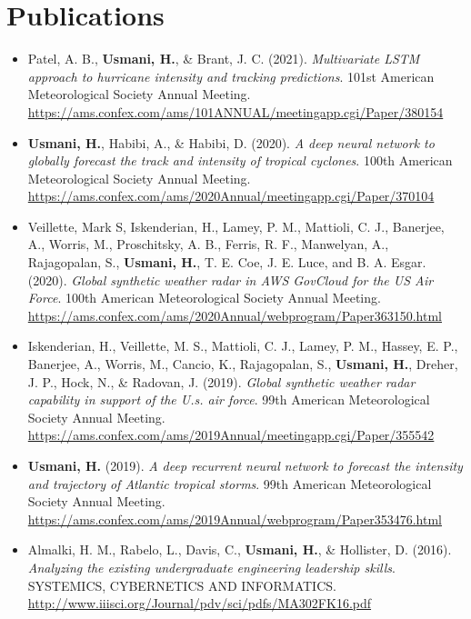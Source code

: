 \documentclass[letterpaper,11pt]{article}
\begin{document}
\section{Publications}
  \begin{itemize}[itemsep=5pt]
    \item Patel, A. B., \textbf{Usmani, H.}, \& Brant, J. C. (2021). \textit{Multivariate LSTM approach to hurricane intensity and tracking predictions}. 101st American Meteorological Society Annual Meeting. \url{https://ams.confex.com/ams/101ANNUAL/meetingapp.cgi/Paper/380154}
    \item \textbf{Usmani, H.}, Habibi, A., \& Habibi, D. (2020). \textit{A deep neural network to globally forecast the track and intensity of tropical cyclones}. 100th American Meteorological Society Annual Meeting. \url{https://ams.confex.com/ams/2020Annual/meetingapp.cgi/Paper/370104}
    \item Veillette, Mark S, Iskenderian, H., Lamey, P. M., Mattioli, C. J., Banerjee, A., Worris, M., Proschitsky, A. B., Ferris, R. F., Manwelyan, A., Rajagopalan, S., \textbf{Usmani, H.}, T. E. Coe, J. E. Luce, and B. A. Esgar. (2020). \textit{Global synthetic weather radar in AWS GovCloud for the US Air Force}. 100th American Meteorological Society Annual Meeting. \url{https://ams.confex.com/ams/2020Annual/webprogram/Paper363150.html}
    \item Iskenderian, H., Veillette, M. S., Mattioli, C. J., Lamey, P. M., Hassey, E. P., Banerjee, A., Worris, M., Cancio, K., Rajagopalan, S., \textbf{Usmani, H.}, Dreher, J. P., Hock, N., \& Radovan, J. (2019). \textit{Global synthetic weather radar capability in support of the U.s. air force}. 99th American Meteorological Society Annual Meeting. \url{https://ams.confex.com/ams/2019Annual/meetingapp.cgi/Paper/355542}
    \item \textbf{Usmani, H.} (2019). \textit{A deep recurrent neural network to forecast the intensity and trajectory of Atlantic tropical storms}. 99th American Meteorological Society Annual Meeting. \url{https://ams.confex.com/ams/2019Annual/webprogram/Paper353476.html}
    \item Almalki, H. M., Rabelo, L., Davis, C., \textbf{Usmani, H.}, \& Hollister, D. (2016). \textit{Analyzing the existing undergraduate engineering leadership skills}. SYSTEMICS, CYBERNETICS AND INFORMATICS. \url{http://www.iiisci.org/Journal/pdv/sci/pdfs/MA302FK16.pdf}
  \end{itemize}
\end{document}
